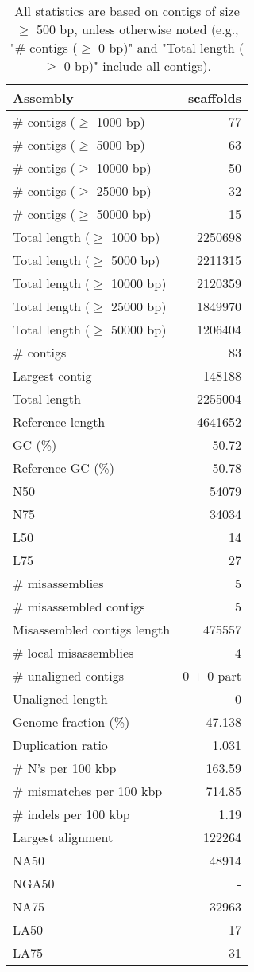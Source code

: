 \documentclass[12pt,a4paper]{article}
\begin{document}
\begin{table}[ht]
\begin{center}
\caption{All statistics are based on contigs of size $\geq$ 500 bp, unless otherwise noted (e.g., "\# contigs ($\geq$ 0 bp)" and "Total length ($\geq$ 0 bp)" include all contigs).}
\begin{tabular}{|l*{1}{|r}|}
\hline
Assembly & scaffolds \\ \hline
\# contigs ($\geq$ 1000 bp) & 77 \\ \hline
\# contigs ($\geq$ 5000 bp) & 63 \\ \hline
\# contigs ($\geq$ 10000 bp) & 50 \\ \hline
\# contigs ($\geq$ 25000 bp) & 32 \\ \hline
\# contigs ($\geq$ 50000 bp) & 15 \\ \hline
Total length ($\geq$ 1000 bp) & 2250698 \\ \hline
Total length ($\geq$ 5000 bp) & 2211315 \\ \hline
Total length ($\geq$ 10000 bp) & 2120359 \\ \hline
Total length ($\geq$ 25000 bp) & 1849970 \\ \hline
Total length ($\geq$ 50000 bp) & 1206404 \\ \hline
\# contigs & 83 \\ \hline
Largest contig & 148188 \\ \hline
Total length & 2255004 \\ \hline
Reference length & 4641652 \\ \hline
GC (\%) & 50.72 \\ \hline
Reference GC (\%) & 50.78 \\ \hline
N50 & 54079 \\ \hline
N75 & 34034 \\ \hline
L50 & 14 \\ \hline
L75 & 27 \\ \hline
\# misassemblies & 5 \\ \hline
\# misassembled contigs & 5 \\ \hline
Misassembled contigs length & 475557 \\ \hline
\# local misassemblies & 4 \\ \hline
\# unaligned contigs & 0 + 0 part \\ \hline
Unaligned length & 0 \\ \hline
Genome fraction (\%) & 47.138 \\ \hline
Duplication ratio & 1.031 \\ \hline
\# N's per 100 kbp & 163.59 \\ \hline
\# mismatches per 100 kbp & 714.85 \\ \hline
\# indels per 100 kbp & 1.19 \\ \hline
Largest alignment & 122264 \\ \hline
NA50 & 48914 \\ \hline
NGA50 & - \\ \hline
NA75 & 32963 \\ \hline
LA50 & 17 \\ \hline
LA75 & 31 \\ \hline
\end{tabular}
\end{center}
\end{table}
\end{document}

